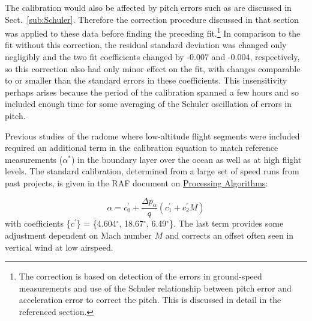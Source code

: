 \documentclass[12pt,twoside,english]{article}\usepackage[]{graphicx}\usepackage[]{color}
\let\OrgIndex\index
\renewcommand*{\index}[1]{\OrgIndex{#1}}
\begin{document}
The calibration would also be affected by pitch errors such as are discussed in Sect.~\ref{sub:Schuler}. Therefore the correction procedure discussed in that section was applied to these data before finding the preceding fit.\footnote{The correction is based on detection of the errors in ground-speed measurements and use of the Schuler relationship between pitch error and acceleration error to correct the pitch. This is discussed in detail in the referenced section.} In comparison to the fit without this correction, the residual standard deviation was changed only negligibly and the two fit coefficients changed by -0.007 and -0.004, respectively, so this correction also had only minor effect on the fit, with changes comparable to or smaller than the standard errors in these coefficients. This insensitivity perhaps arises because the period of the calibration spanned a few hours and so included enough time for some averaging of the Schuler oscillation of errors in pitch.




Previous studies of the radome where low-altitude flight segments were included required an additional term in the calibration equation to match reference measurements ($\alpha^{*}$) in the boundary layer over the ocean as well as at high flight levels. The standard calibration, determined from a large set of speed runs from past projects, is given in the RAF document on \href{https://drive.google.com/open?id=0B1kIUH45ca5Ab2Z6cld1M1cydjA&authuser=0}{Processing Algorithms}: 

\begin{equation}
\alpha=c_{0}^{\prime}+\frac{\Delta p_{\alpha}}{q}(c_{1}^{\prime}+c_{2}^{\prime}M)\label{eq:AOAstandard} 
\end{equation}
with coefficients \{$c^{\prime}$\} = \{4.604$^{\circ}$, 18.67$^{\circ}$,
6.49$^{\circ}$\}. The last term provides some adjustment dependent
on Mach number $M$ and corrects an offset often
seen in vertical wind at low airspeed.
\end{document}
